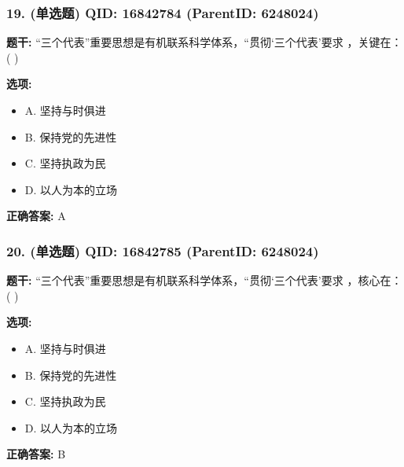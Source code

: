 \documentclass[12pt,UTF8]{ctexart}
\begin{document}
\vspace{0.3em}\hrulefill\vspace{0.7em}

\subsubsection*{19. (单选题) \small QID: 16842784 (ParentID: 6248024)}

\textbf{题干:}
“三个代表”重要思想是有机联系科学体系，“贯彻‘三个代表’要求 ，关键在： ( )



\textbf{选项:}
\begin{itemize}[leftmargin=*]

  \item A. 坚持与时俱进

  \item B. 保持党的先进性

  \item C. 坚持执政为民

  \item D. 以人为本的立场

\end{itemize}

\textbf{正确答案:}
A

\vspace{0.3em}\hrulefill\vspace{0.7em}

\subsubsection*{20. (单选题) \small QID: 16842785 (ParentID: 6248024)}

\textbf{题干:}
“三个代表”重要思想是有机联系科学体系，“贯彻‘三个代表’要求 ，核心在： ( )



\textbf{选项:}
\begin{itemize}[leftmargin=*]

  \item A. 坚持与时俱进

  \item B. 保持党的先进性

  \item C. 坚持执政为民

  \item D. 以人为本的立场

\end{itemize}

\textbf{正确答案:}
B
\end{document}
